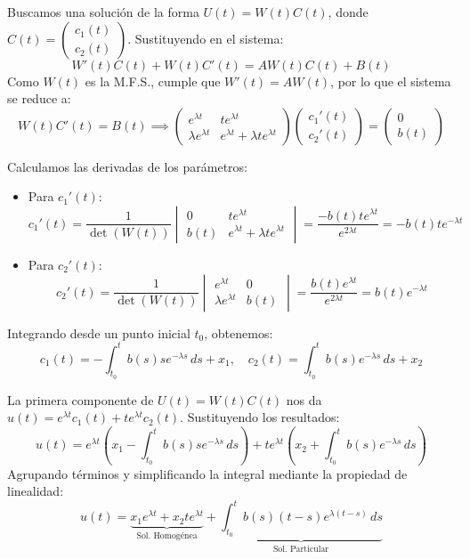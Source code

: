 Buscamos una solución de la forma $U(t) = W(t)C(t)$, donde $C(t) = \begin{pmatrix} c_1(t) \\ c_2(t) \end{pmatrix}$. Sustituyendo en el sistema:
\[
    W'(t)C(t) + W(t)C'(t) = A W(t)C(t) + B(t)
\]
Como $W(t)$ es la M.F.S., cumple que $W'(t) = A W(t)$, por lo que el sistema se reduce a:
\[
    W(t)C'(t) = B(t) \implies 
    \begin{pmatrix}
        e^{\lambda t} & t e^{\lambda t} \\
        \lambda e^{\lambda t} & e^{\lambda t} + \lambda t e^{\lambda t}
    \end{pmatrix} 
    \begin{pmatrix} c_1'(t) \\ c_2'(t) \end{pmatrix} = 
    \begin{pmatrix} 0 \\ b(t) \end{pmatrix}
\]

Calculamos las derivadas de los parámetros:
\begin{itemize}
    \item Para $c_1'(t)$:
    \[
        c_1'(t) = \frac{1}{\det (W(t))} \begin{vmatrix} 0 & t e^{\lambda t} \\ b(t) & e^{\lambda t} + \lambda t e^{\lambda t} \end{vmatrix} = \frac{-b(t) t e^{\lambda t}}{e^{2\lambda t}} = -b(t) t e^{-\lambda t}
    \]
    \item Para $c_2'(t)$:
    \[
        c_2'(t) = \frac{1}{\det (W(t))} \begin{vmatrix} e^{\lambda t} & 0 \\ \lambda e^{\lambda t} & b(t) \end{vmatrix} = \frac{b(t) e^{\lambda t}}{e^{2\lambda t}} = b(t) e^{-\lambda t}
    \]
\end{itemize}

Integrando desde un punto inicial $t_0$, obtenemos:
\[
    c_1(t) = -\int_{t_0}^{t} b(s) s e^{-\lambda s} \, ds + x_1, \quad c_2(t) = \int_{t_0}^{t} b(s) e^{-\lambda s} \, ds + x_2
\]

La primera componente de $U(t) = W(t)C(t)$ nos da $u(t) = e^{\lambda t} c_1(t) + t e^{\lambda t} c_2(t)$. Sustituyendo los resultados:
\[
    u(t) = e^{\lambda t} \left( x_1 - \int_{t_0}^{t} b(s) s e^{-\lambda s} \, ds \right) + t e^{\lambda t} \left( x_2 + \int_{t_0}^{t} b(s) e^{-\lambda s} \, ds \right)
\]
Agrupando términos y simplificando la integral mediante la propiedad de linealidad:
\[
    u(t) = \underbrace{x_1 e^{\lambda t} + x_2 t e^{\lambda t}}_{\text{Sol. Homogénea}} + \underbrace{\int_{t_0}^{t} b(s) (t - s) e^{\lambda (t - s)} \, ds}_{\text{Sol. Particular}}
\]
